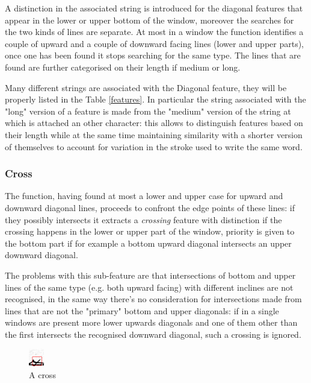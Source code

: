 A distinction in the associated string is introduced for the diagonal features that appear in the lower or upper bottom of the window, moreover the searches for the two kinds of lines are separate.
At most in a window the function identifies a couple of upward and a couple of downward facing lines (lower and upper parts), once one has been found it stops searching for the same type.
The lines that are found are further categorised on their length if medium or long.

Many different strings are associated with the Diagonal feature, they will be properly listed in the Table \ref{features}.
In particular the string associated with the "long" version of a feature is made from the "medium" version of the string at which is attached an other character: this allows to distinguish features based on their length while at the same time maintaining similarity with a shorter version of themselves to account for variation in the stroke used to write the same word.  
 
\subsubsection{Cross}
The function, having found at most a lower and upper case for upward and downward diagonal lines, proceeds to confront the edge points of these lines: if they possibly intersects it extracts a \emph{crossing} feature with distinction if the crossing happens in the lower or upper part of the window, priority is given to the bottom part if for example a bottom upward diagonal intersects an upper downward diagonal. 

The problems with this sub-feature are that intersections of bottom and upper lines of the same type (e.g. both upward facing) with different inclines are not recognised, in the same way there's no consideration for intersections made from lines that are not the "primary" bottom and upper diagonals: if in a single windows are present more lower upwards diagonals and one of them other than the first intersects the recognised downward diagonal, such a crossing is ignored.

\begin{figure}
  \vspace{-20pt}
  \begin{center}
    \includegraphics[width=0.06\textwidth]{images/cross.jpg}
  \end{center}
  \vspace{-20pt}
  \caption{A cross}
  \vspace{-10pt}
\end{figure}


